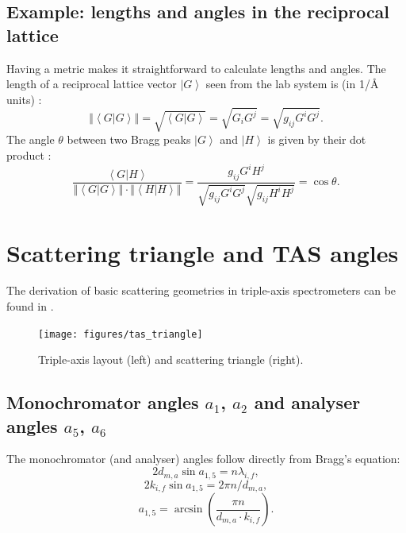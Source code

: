 \subsection*{Example: lengths and angles in the reciprocal lattice}
Having a metric makes it straightforward to calculate lengths and angles.
The length of a reciprocal lattice vector $\left| G \right>$ seen from the lab system is (in 1/\AA{} units) \cite[p. 808]{Arens2015}:
\begin{equation}
	\left\Vert \left< G | G \right> \right\Vert = \sqrt{\left< G | G \right>} = \sqrt{G_i G^j} = \sqrt{g_{ij} G^i G^j}.
\end{equation}
The angle $\theta$ between two Bragg peaks $\left| G \right>$ and $\left| H \right>$ is given by their dot product \cite[p. 808]{Arens2015}:
\begin{equation}
	\frac{\left< G | H \right>}{\left\Vert \left< G | G \right> \right\Vert \cdot \left\Vert \left< H | H \right> \right\Vert} = 
	\frac{g_{ij} G^i H^j }{\sqrt{g_{ij} G^i G^j} \sqrt{g_{ij} H^i H^j}} = \cos \theta.
\end{equation}




\section{Scattering triangle and TAS angles \label{sec:tasangles}}

The derivation of basic scattering geometries in triple-axis spectrometers can be found in \cite[Ch. 1.3]{Shirane2002}.

\begin{figure}
\begin{center}
	\texttt{[image: figures/tas\_triangle]}
\end{center}
\caption{Triple-axis layout (left) and scattering triangle (right).}
\end{figure}


\subsection*{Monochromator angles $a_1$, $a_2$ and analyser angles $a_5$, $a_6$}

The monochromator (and analyser) angles follow directly from Bragg's equation:
\begin{equation} 2 d_{m,a}\sin a_{1,5} = n \lambda_{i,f}, \end{equation}
\begin{equation} 2 k_{i,f} \sin a_{1,5} = 2 \pi n / d_{m,a}, \end{equation}
\begin{equation} \boxed{ a_{1,5} = \arcsin \left( \frac{\pi n}{d_{m,a} \cdot k_{i,f}} \right). } \end{equation}

